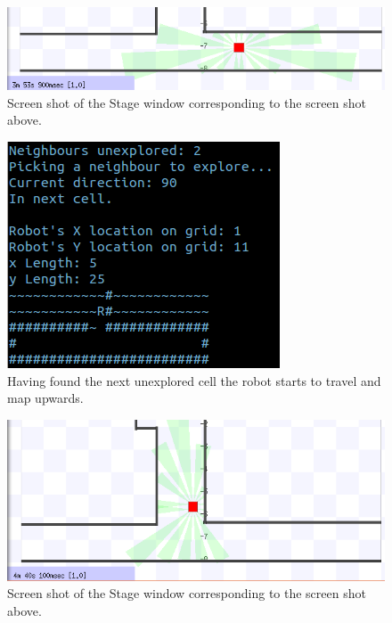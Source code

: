 \documentclass[a4paper,12pt]{article}
\begin{document}
\begin{figure}[H]
\includegraphics[scale=0.9]{RunS1.png}
\caption{Screen shot of the Stage window corresponding to the screen shot above.}
\end{figure}

\begin{figure}[H]
\includegraphics[scale=1.0]{RunT2.png}
\caption{Having found the next unexplored cell the robot starts to travel and map upwards.}
\end{figure}

\begin{figure}[H]
\includegraphics[scale=0.9]{RunS2.png}
\caption{Screen shot of the Stage window corresponding to the screen shot above.}
\end{figure}
\end{document}
